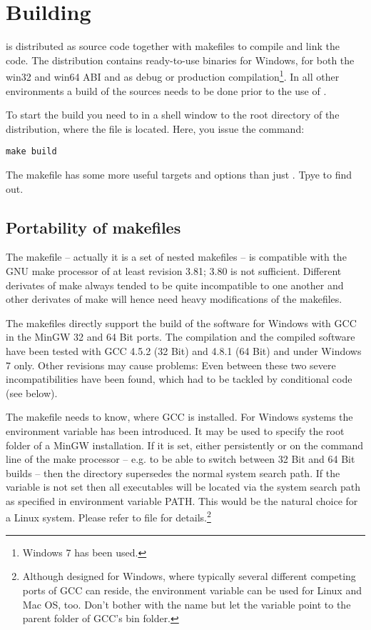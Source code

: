 \chapter{Building \linnet{}}
\label{secBuildingLinNet}

\linnet{} is distributed as source code together with makefiles to compile
and link the code. The distribution contains ready-to-use binaries for
Windows, for both the win32 and win64 ABI and as debug or production
compilation\footnote{Windows 7 has been used.}. In all other environments
a build of the sources needs to be done prior to the use of \linnet{}.

To start the build you need to  in a shell window to the root
directory of the \linnet{} distribution, where the file 
is located. Here, you issue the command:
\begin{verbatim}
make build
\end{verbatim}
The makefile has some more useful targets and options than just
. Tpye  to find out.


\section{Portability of makefiles}

The makefile -- actually it is a set of nested makefiles -- is compatible
with the GNU make processor of at least revision 3.81; 3.80 is not
sufficient. Different derivates of make always tended to be quite
incompatible to one another and other derivates of make will hence need
heavy modifications of the makefiles.

The makefiles directly support the build of the software for Windows with
GCC in the MinGW 32 and 64 Bit ports. The compilation and the compiled
software have been tested with GCC 4.5.2 (32 Bit) and 4.8.1 (64 Bit) and
under Windows 7 only. Other revisions may cause problems: Even between
these two severe incompatibilities have been found, which had to be
tackled by conditional code (see below).

The makefile needs to know, where GCC is installed. For Windows systems
the environment variable  has been introduced. It may
be used to specify the root folder of a MinGW installation. If it is set,
either persistently or on the command line of the make processor -- e.g.
to be able to switch between 32 Bit and 64 Bit builds -- then the
directory  supersedes the normal system
search path. If the variable is not set then all executables will be
located via the system search path as specified in environment variable
PATH. This would be the natural choice for a Linux system. Please refer to
file  for details.\footnote{Although designed for
Windows, where typically several different competing ports of GCC can
reside, the environment variable can be used for Linux and Mac OS, too.
Don't bother with the name but let the variable point to the parent folder
of GCC's bin folder.}

